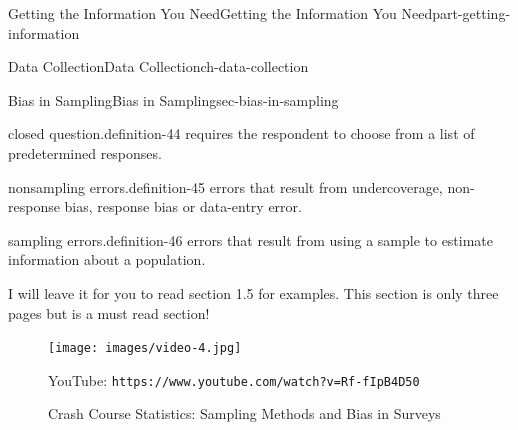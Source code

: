 \documentclass[oneside,10pt,]{book}
\newcommand{\mono}[1]{\texttt{#1}}
\numberwithin{equation}{section}
\newlength{\qrsize}
\newlength{\previewwidth}
\begin{document}
\begin{partptx}{Getting the Information You Need}{}{Getting the Information You Need}{}{}{part-getting-information}
\begin{chapterptx}{Data Collection}{}{Data Collection}{}{}{ch-data-collection}
\begin{sectionptx}{Bias in Sampling}{}{Bias in Sampling}{}{}{sec-bias-in-sampling}
\begin{definition}{closed question.}{definition-44}%
requires the respondent to choose from a list of predetermined responses.\end{definition}
\begin{definition}{nonsampling errors.}{definition-45}%
errors that result from undercoverage, non-response bias, response bias or data-entry error.\end{definition}
\begin{definition}{sampling errors.}{definition-46}%
errors that result from using a sample to estimate information about a population.\end{definition}
\hypertarget{p-33}{}%
I will leave it for you to read section 1.5 for examples. This section is only three pages but is a must read section!%
\begin{figure}
\centering
\setlength{\qrsize}{9em}
\setlength{\previewwidth}{\linewidth}
\addtolength{\previewwidth}{-\qrsize}
\begin{tcbraster}[raster columns=2, raster column skip=1pt, raster halign=center, raster force size=false, raster left skip=0pt, raster right skip=0pt]%
\begin{tcolorbox}[previewstyle, width=\previewwidth]%
\texttt{[image: images/video-4.jpg]}%
\end{tcolorbox}%
\begin{tcolorbox}[qrstyle]%
{\hypersetup{urlcolor=black}}%
\end{tcolorbox}%
\begin{tcolorbox}[captionstyle]%
\small YouTube: \mono{https://www.youtube.com/watch?v=Rf-fIpB4D50}\end{tcolorbox}%
\end{tcbraster}%
\caption{Crash Course Statistics: Sampling Methods and Bias in Surveys\label{figure-4}}
\end{figure}
\end{sectionptx}
\end{chapterptx}
\end{partptx}
%
%
\typeout{************************************************}
\typeout{************************************************}
%
\end{document}
